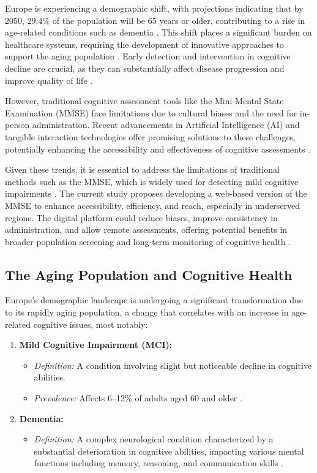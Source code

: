 Europe is experiencing a demographic shift, with projections indicating that by 2050, 29.4\% of the population will be 65 years or older, contributing to a rise in age-related conditions such as dementia \cite{Eurostat2020, Marques2011}. This shift places a significant burden on healthcare systems, requiring the development of innovative approaches to support the aging population \cite{Zhang2022}. Early detection and intervention in cognitive decline are crucial, as they can substantially affect disease progression and improve quality of life \cite{BlakehurstVet2022}.

However, traditional cognitive assessment tools like the Mini-Mental State Examination (MMSE) face limitations due to cultural biases and the need for in-person administration. Recent advancements in Artificial Intelligence (AI) and tangible interaction technologies offer promising solutions to these challenges, potentially enhancing the accessibility and effectiveness of cognitive assessments \cite{Marques2011}.

Given these trends, it is essential to address the limitations of traditional methods such as the MMSE, which is widely used for detecting mild cognitive impairments \cite{Folstein1975}. The current study proposes developing a web-based version of the MMSE to enhance accessibility, efficiency, and reach, especially in underserved regions. The digital platform could reduce biases, improve consistency in administration, and allow remote assessments, offering potential benefits in broader population screening and long-term monitoring of cognitive health \cite{Bauer2012, Zygouris2017, Seifan2015}.

\subsection{The Aging Population and Cognitive Health}
Europe's demographic landscape is undergoing a significant transformation due to its rapidly aging population, a change that correlates with an increase in age-related cognitive issues, most notably:

\begin{enumerate}
    \item \textbf{Mild Cognitive Impairment (MCI):}
    \begin{itemize}
        \item \textit{Definition:} A condition involving slight but noticeable decline in cognitive abilities.
        \item \textit{Prevalence:} Affects 6--12\% of adults aged 60 and older \cite{Petersen2018}.
    \end{itemize}
    
    \item \textbf{Dementia:}
    \begin{itemize}
        \item \textit{Definition:} A complex neurological condition characterized by a substantial deterioration in cognitive abilities, impacting various mental functions including memory, reasoning, and communication skills \cite{WHO2023}.
    \end{itemize}
\end{enumerate}


